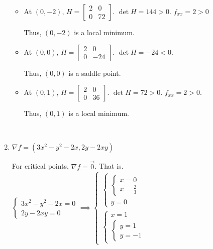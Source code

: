 \begin{enumerate}
    \begin{itemize}
        \item At $(0, -2)$, $H = \begin{bmatrix} 2 & 0 \\ 0 & 72 \end{bmatrix}$. $\det H = 144 > 0$. $f_{xx} = 2 > 0$
        
        Thus, $(0, -2)$ is a local minimum. 

        \item At $(0, 0)$, $H = \begin{bmatrix} 2 & 0 \\ 0 & -24 \end{bmatrix}$. $\det H = -24 < 0$.
        
        Thus, $(0, 0)$ is a saddle point. 

        \item At $(0, 1)$, $H = \begin{bmatrix} 2 & 0 \\ 0 & 36 \end{bmatrix}$. $\det H = 72 > 0$. $f_{xx} = 2 > 0$. 
        
        Thus, $(0, 1)$ is a local minimum. 
    \end{itemize}

    {~~~}
    
    \item $\nabla f = \left( 3x^2 - y^2 - 2x, 2y - 2xy \right)$

    For critical points, $\nabla f = \vec{0}$. That is. $\begin{cases} 3x^2 - y^2 - 2x = 0 \\ 2y - 2xy = 0 \end{cases} \implies \begin{cases} \begin{cases} \begin{cases} x = 0 \\ x = \frac{2}{3} \end{cases} \\ y = 0 \end{cases} \\ \begin{cases} x = 1 \\ \begin{cases} y = 1 \\ y = -1 \end{cases} \end{cases} \end{cases}$


\end{enumerate}

